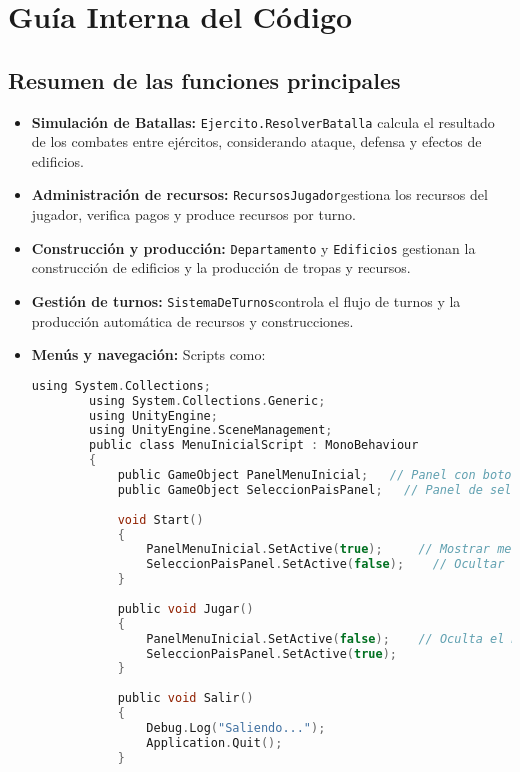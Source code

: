 \documentclass[a4paper,12pt]{article}
\begin{document}
\section{Guía Interna del Código}

\subsection{Resumen de las funciones principales}
\begin{itemize}
    \item \textbf{Simulación de Batallas:} \colorbox{yellow!30}{\texttt{Ejercito.ResolverBatalla}} calcula el resultado de los combates entre ejércitos, considerando ataque, defensa y efectos de edificios.
    \item \textbf {Administración de recursos:} \colorbox{yellow!30}{\texttt{RecursosJugador}}gestiona los recursos del jugador, verifica pagos y produce recursos por turno.
    \item \textbf{Construcción y producción:} \colorbox{yellow!30}{\texttt{Departamento}} y \colorbox{yellow!30}{\texttt{Edificios}} gestionan la construcción de edificios y la producción de tropas y recursos.
    \item \textbf{Gestión de turnos: }\colorbox{yellow!30}{\texttt{SistemaDeTurnos}}controla el flujo de turnos y la producción automática de recursos y construcciones.
    \item \textbf{Menús y navegación:} Scripts como: 
    \begin{lstlisting}[language=c, caption={Clase Menú inicial}]
        using System.Collections;
        using System.Collections.Generic;
        using UnityEngine;
        using UnityEngine.SceneManagement; 
        public class MenuInicialScript : MonoBehaviour
        {
            public GameObject PanelMenuInicial;   // Panel con botones Jugar y Salir
            public GameObject SeleccionPaisPanel;   // Panel de seleccion de pais
        
            void Start()
            {
                PanelMenuInicial.SetActive(true);     // Mostrar menu principal
                SeleccionPaisPanel.SetActive(false);    // Ocultar seleccion pais
            }
        
            public void Jugar()
            {
                PanelMenuInicial.SetActive(false);    // Oculta el menu principal
                SeleccionPaisPanel.SetActive(true);
            }
        
            public void Salir()
            {
                Debug.Log("Saliendo...");
                Application.Quit();
            }
        

\end{lstlisting}
\end{itemize}
\end{document}
